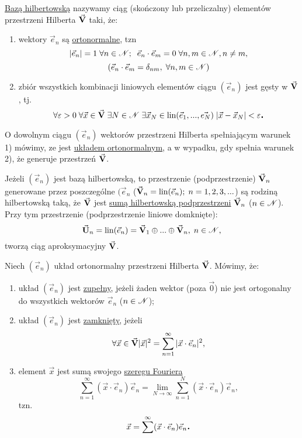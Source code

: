 \begin{mydef}
   \underline{Bazą hilbertowską} nazywamy ciąg (skończony lub przeliczalny) elementów przestrzeni Hilberta $\vec{\mathbf{V}}$ taki, że:
   \begin{enumerate}
    \item wektory $\vec{e}_n$ są \underline{ortonormalne}, tzn
    \[|\vec{e}_n| = 1 \; \forall n \in \mathscr{N}; \;\; \vec{e}_n\cdot \vec{e}_m = 0 \; \forall n,m \in \mathscr{N}, n \neq m,\]
    \[(\vec{e}_n \cdot \vec{e}_m = \delta_{n m}, \; \forall n,m \in \mathscr{N})\]
    \item zbiór wszystkich kombinacji liniowych elementów ciągu $(\vec{e}_n)$ jest gęsty w $\vec{\mathbf{V}}$, tj.
    \[\forall \varepsilon > 0 \;\forall \vec{x} \in \vec{\mathbf{V}}\; \exists N \in \mathscr{N} \; \exists \vec{x}_N \in \normalfont\mbox{lin} (\vec{e}_1, ..., \vec{e_N}) \; |\vec{x} - \vec{x}_N| < \varepsilon \mbox{\large\bfseries .}\]
   \end{enumerate}
\end{mydef}

\begin{info}
   O dowolnym ciągu $(\vec{e}_n)$ wektorów przestrzeni Hilberta spełniającym warunek 1) mówimy, ze jest \underline{układem ortonormalnym}, a w wypadku, gdy spełnia warunek 2), że generuje przestrzeń $\vec{\mathbf{V}}$.
\end{info}

\begin{info}
   Jeżeli $(\vec{e}_n)$ jest bazą hilbertowską, to przestrzenie (podprzestrzenie) $\vec{\mathbf{V}}_n$ generowane przez poszczególne $(\vec{e}_n$ ($\vec{\mathbf{V}}_n = \normalfont\mbox{lin} (\vec{e}_n); \; n=1,2,3,...$) są rodziną hilbertowską taką, że $\vec{\mathbf{V}}$ jest \underline{sumą hilbertowską podprzestrzeni} $\vec{\mathbf{V}}_n$ ($n \in \mathscr{N}$). Przy tym przestrzenie (podprzestrzenie liniowe domknięte):
   \[\vec{\mathbf{U}}_n = \normalfont\mbox{lin} (\vec{e}_n) = \vec{\mathbf{V}}_1 \oplus ...\oplus \vec{\mathbf{V}}_n, \; n \in \mathscr{N},\]
   tworzą ciąg aproksymacyjny $\vec{\mathbf{V}}$.
\end{info}

\begin{mydef}
   Niech $(\vec{e}_n)$ układ ortonormalny przestrzeni Hilberta $\vec{\mathbf{V}}$. Mówimy, że:
   \begin{enumerate}
    \item układ $(\vec{e}_n)$ jest \underline{zupełny}, jeżeli żaden wektor (poza $\vec{0}$) nie jest ortogonalny do wszystkich wektorów $\vec{e}_n$ ($n \in \mathscr{N}$);
    \item układ $(\vec{e}_n)$ jest \underline{zamknięty}, jeżeli
    \[\forall \vec{x} \in \vec{\mathbf{V}} |\vec{x}|^2 = \sum\limits_{n=1}^{\infty} |\vec{x} \cdot \vec{e}_n|^2,\]
    \item element $\vec{x}$ jest sumą swojego \underline{szeregu Fouriera}
    \[\sum\limits_{n=1}^{\infty} (\vec{x} \cdot \vec{e}_n) \vec{e}_n = \lim\limits_{N\to \infty} \sum\limits_{n=1}^N (\vec{x} \cdot \vec{e}_n) \vec{e}_n,\]
    tzn.
    \[\vec{x} = \sum\limits^{\infty} (\vec{x} \cdot \vec{e}_n) \vec{e}_n \mbox{\large\bfseries .}\]
   \end{enumerate}
\end{mydef}

